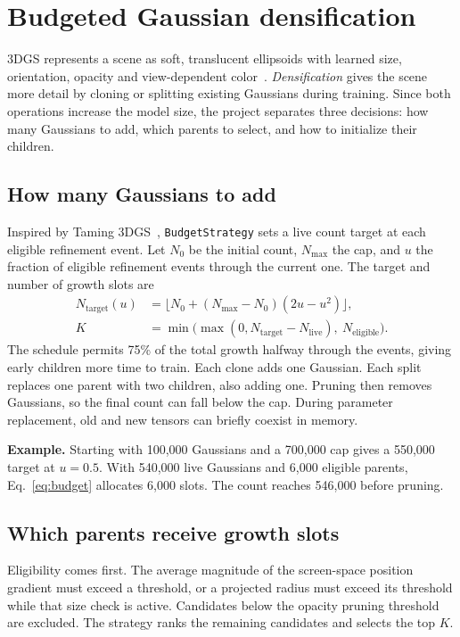 \documentclass[11pt,a4paper]{article}
\begin{document}
\clearpage
\section{Budgeted Gaussian densification}
\label{sec:allocation}
3DGS represents a scene as soft, translucent ellipsoids with learned size,
orientation, opacity and view-dependent color~\cite{kerbl,gsplat}.
\emph{Densification} gives the scene more detail by cloning or splitting
existing Gaussians during training. Since both operations increase the
model size, the project separates three decisions: how many Gaussians to
add, which parents to select, and how to initialize their children.

\subsection{How many Gaussians to add}
Inspired by Taming 3DGS~\cite{taming}, \texttt{BudgetStrategy} sets a live
count target at each eligible refinement event. Let $N_0$ be the initial
count, $N_{\max}$ the cap, and $u$ the fraction of eligible refinement
events through the current one. The target and number of growth slots are
\begin{equation}
  \begin{aligned}
    N_{\mathrm{target}}(u)&=\bigl\lfloor N_0+(N_{\max}-N_0)(2u-u^2)\bigr\rfloor,\\
    K&=\min\bigl(\max(0,N_{\mathrm{target}}-N_{\mathrm{live}}),\ N_{\mathrm{eligible}}\bigr).
  \end{aligned}
  \label{eq:budget}
\end{equation}
The schedule permits 75\% of the total growth halfway through the events,
giving early children more time to train. Each clone adds one Gaussian.
Each split replaces one parent with two children, also adding one. Pruning
then removes Gaussians, so the final count can fall below the cap. During
parameter replacement, old and new tensors can briefly coexist in memory.

\textbf{Example.} Starting with 100,000 Gaussians and a 700,000 cap gives a
550,000 target at $u=0.5$. With 540,000 live Gaussians and 6,000 eligible
parents, Eq.~\eqref{eq:budget} allocates 6,000 slots. The count reaches
546,000 before pruning.

\subsection{Which parents receive growth slots}
Eligibility comes first. The average magnitude of the screen-space position
gradient must exceed a threshold, or a projected radius must exceed its
threshold while that size check is active. Candidates below the opacity
pruning threshold are excluded. The strategy ranks the remaining candidates
and selects the top $K$.
\end{document}

